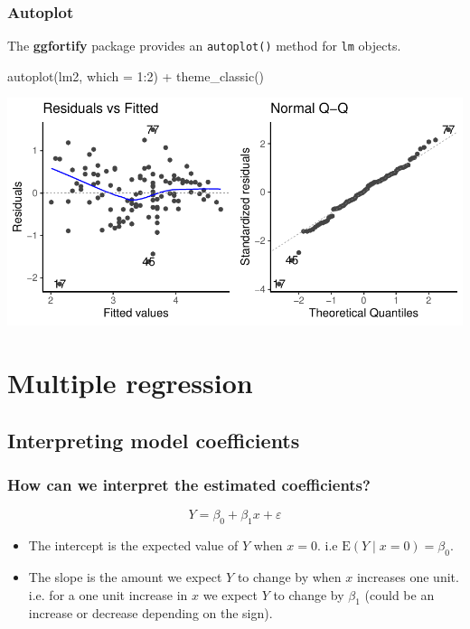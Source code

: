 \documentclass[a4paper]{article}
\begin{document}
\subsubsection{Autoplot}
The \textbf{ggfortify} package provides an \lstinline|autoplot()| method for \lstinline|lm| objects.
\begin{Schunk}
\begin{Sinput}
autoplot(lm2, which = 1:2) + theme_classic()
\end{Sinput}


{\centering \includegraphics[width=\maxwidth]{figure/listings-unnamed-chunk-353-1} 

}

\end{Schunk}

\section{Multiple regression}\label{sec:27}
\subsection{Interpreting model coefficients}
\subsubsection{How can we interpret the estimated coefficients?}
\[
	Y = \beta_0 + \beta_1 x + \varepsilon
\]
\begin{itemize}
	\item The intercept is the expected value of \( Y \) when \( x = 0 \). i.e \( \mathrm{E}(Y \mid x=0) = \beta_0 \).
	\item The slope is the amount we expect \( Y \) to change by when \( x \) increases one unit. i.e. for a one unit increase in \( x \) we expect \( Y \) to change by \( \beta_1 \) (could be an increase or decrease depending on the sign).
\end{itemize}
\end{document}
